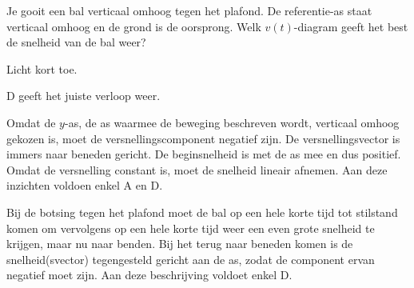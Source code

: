 

\item{}\begin{minipage}[t]{.45\linewidth}
Je gooit een bal verticaal omhoog tegen het plafond. De referentie-as staat verticaal omhoog en de grond is de oorsprong. %
Welk $v(t)$-diagram geeft het best de snelheid van de bal weer? 

\vspace{\baselineskip}
Licht kort toe.
\end{minipage}
\hfill
\begin{minipage}[t]{.5\linewidth}
	\raisebox{1ex-\height}{%
		\texttt{[image: 3p90]}} 
\end{minipage}

\begin{oplossing}
D geeft het juiste verloop weer.

Omdat de $y$-as, de as waarmee de beweging beschreven wordt, verticaal omhoog gekozen is, moet de versnellingscomponent negatief zijn. De versnellingsvector is immers naar beneden gericht. De beginsnelheid is met de as mee en dus positief. Omdat de versnelling constant is, moet de snelheid lineair afnemen. Aan deze inzichten voldoen enkel A en D.

Bij de botsing tegen het plafond moet de bal op een hele korte tijd tot stilstand komen om vervolgens op een hele korte tijd weer een even grote snelheid te krijgen, maar nu naar benden. Bij het terug naar beneden komen is de snelheid(svector) tegengesteld gericht aan de as, zodat de component ervan negatief moet zijn. Aan deze beschrijving voldoet enkel D.

\end{oplossing}